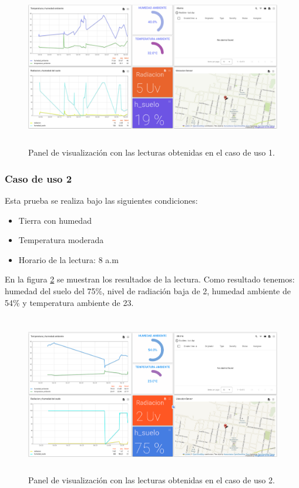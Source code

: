 \begin{figure}[h!]
  \centering
    \includegraphics[width=\linewidth, height=7cm]{./Figures/tb_prueba1.png}
  \caption{Panel de visualización con las lecturas obtenidas en el caso de uso 1.}
    \label{fig:Lectura tierra seca tb}
\end{figure}

\subsubsection{Caso de uso 2}
Esta prueba se realiza bajo las siguientes condiciones:
\begin{itemize}
  \item Tierra con humedad
  \item Temperatura moderada
  \item Horario de la lectura: 8 a.m
\end{itemize}

En la figura \ref{fig:Humedad alta ThingsBoard} se muestran los resultados de la lectura. Como resultado tenemos: humedad del suelo del 75\%, nivel de radiación baja de 2, humedad ambiente de 54\% y temperatura ambiente de 23\textcelsius.

\begin{figure}[h!]
  \centering
    \includegraphics[width=\linewidth, height=7cm]{./Figures/humedad_alta_tb.png}
  \caption{Panel de visualización con las lecturas obtenidas en el caso de uso 2.}
    \label{fig:Humedad alta ThingsBoard}
\end{figure}


